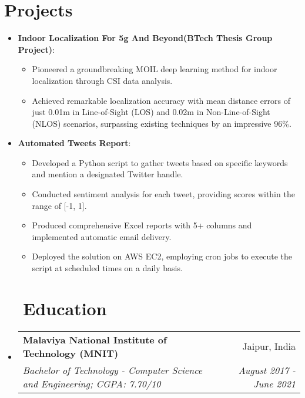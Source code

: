 \documentclass[a4paper,20pt]{article}
\makeatletter
\newcommand{\resumeItem}[2]{
  \item\small{
    \textbf{#1}{: #2 \vspace{-2pt}}
  }
}
\newcommand{\resumeSubheading}[4]{
  \vspace{-1pt}\item
    \begin{tabular*}{0.97\textwidth}{l@{\extracolsep{\fill}}r}
      \textbf{#1} & #2 \\
      \textit{#3} & \textit{#4} \\
    \end{tabular*}\vspace{-5pt}
}
\newcommand{\resumeSubItem}[2]{\resumeItem{#1}{#2}\vspace{-3pt}}
\newcommand{\resumeSubHeadingListStart}{\begin{itemize}[leftmargin=*]}
\newcommand{\resumeSubHeadingListEnd}{\end{itemize}}
\makeatother
\begin{document}
\vspace{-3pt}
\section{Projects}
\resumeSubHeadingListStart
\resumeSubItem{Indoor Localization For 5g And Beyond(BTech Thesis Group Project)}{}
\vspace{-2pt}
\begin{itemize}[label=$\circ$]
\item Pioneered a groundbreaking MOIL deep learning method for indoor localization through CSI data analysis.
\vspace{-3pt}
\item Achieved remarkable localization accuracy with mean distance errors of just 0.01m in Line-of-Sight (LOS) and 0.02m in Non-Line-of-Sight (NLOS) scenarios, surpassing existing techniques by an impressive 96\%.
\end{itemize}
\vspace{-8pt}
\resumeSubItem{Automated Tweets Report}{}
\vspace{-2pt}
\begin{itemize}[label=$\circ$]
\item Developed a Python script to gather tweets based on specific keywords and mention a designated Twitter handle.
\vspace{-3pt}
\item Conducted sentiment analysis for each tweet, providing scores within the range of [-1, 1].
\vspace{-3pt}
\item Produced comprehensive Excel reports with 5+ columns and implemented automatic email delivery.
\vspace{-3pt}
\item Deployed the solution on AWS EC2, employing cron jobs to execute the script at scheduled times on a daily basis.
\end{itemize}
\vspace{-2pt}
\resumeSubHeadingListEnd

\section{~~Education}
  \resumeSubHeadingListStart
    \resumeSubheading
      {Malaviya National Institute of Technology (MNIT)}{Jaipur, India}
      {Bachelor of Technology - Computer Science and Engineering;  CGPA: 7.70/10}{August 2017 - June 2021}
    \resumeSubHeadingListEnd
	
\end{document}

